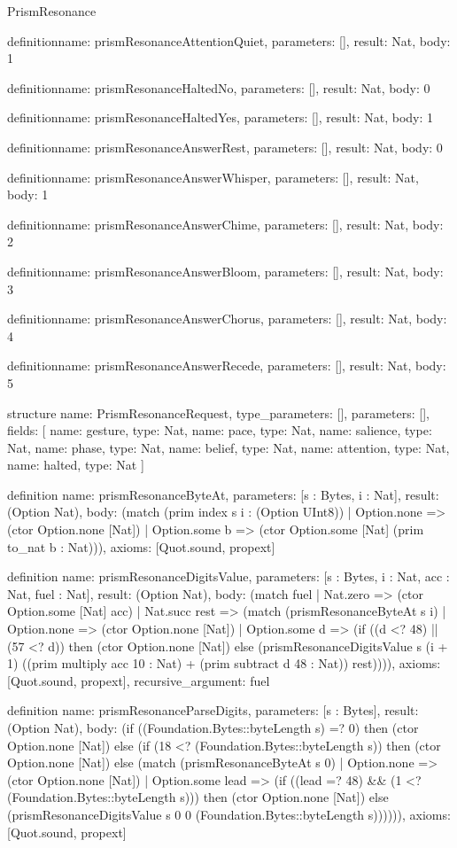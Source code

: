 \begin{lexlean}{PrismResonance}
\begin{semanticmodule}
definition{name: prismResonanceAttentionQuiet, parameters: [], result: Nat, body: 1}

definition{name: prismResonanceHaltedNo, parameters: [], result: Nat, body: 0}

definition{name: prismResonanceHaltedYes, parameters: [], result: Nat, body: 1}

definition{name: prismResonanceAnswerRest, parameters: [], result: Nat, body: 0}

definition{name: prismResonanceAnswerWhisper, parameters: [], result: Nat, body: 1}

definition{name: prismResonanceAnswerChime, parameters: [], result: Nat, body: 2}

definition{name: prismResonanceAnswerBloom, parameters: [], result: Nat, body: 3}

definition{name: prismResonanceAnswerChorus, parameters: [], result: Nat, body: 4}

definition{name: prismResonanceAnswerRecede, parameters: [], result: Nat, body: 5}

structure{
  name: PrismResonanceRequest,
  type_parameters: [],
  parameters: [],
  fields: [
    {name: gesture, type: Nat},
    {name: pace, type: Nat},
    {name: salience, type: Nat},
    {name: phase, type: Nat},
    {name: belief, type: Nat},
    {name: attention, type: Nat},
    {name: halted, type: Nat}
  ]
}

definition{
  name: prismResonanceByteAt,
  parameters: [s : Bytes, i : Nat],
  result: (Option Nat),
  body: (match (prim index s i : (Option UInt8))
    | Option.none => (ctor Option.none [Nat])
    | Option.some b => (ctor Option.some [Nat] (prim to_nat b : Nat))),
  axioms: [Quot.sound, propext]
}

definition{
  name: prismResonanceDigitsValue,
  parameters: [s : Bytes, i : Nat, acc : Nat, fuel : Nat],
  result: (Option Nat),
  body: (match fuel
    | Nat.zero => (ctor Option.some [Nat] acc)
    | Nat.succ rest => (match (prismResonanceByteAt s i)
      | Option.none => (ctor Option.none [Nat])
      | Option.some d => (if ((d <? 48) || (57 <? d)) then (ctor Option.none [Nat]) else (prismResonanceDigitsValue s (i + 1) ((prim multiply acc 10 : Nat) + (prim subtract d 48 : Nat)) rest)))),
  axioms: [Quot.sound, propext],
  recursive_argument: fuel
}

definition{
  name: prismResonanceParseDigits,
  parameters: [s : Bytes],
  result: (Option Nat),
  body: (if ((Foundation.Bytes::byteLength s) =? 0) then (ctor Option.none [Nat]) else (if (18 <? (Foundation.Bytes::byteLength s)) then (ctor Option.none [Nat]) else (match (prismResonanceByteAt s 0)
    | Option.none => (ctor Option.none [Nat])
    | Option.some lead => (if ((lead =? 48) && (1 <? (Foundation.Bytes::byteLength s))) then (ctor Option.none [Nat]) else (prismResonanceDigitsValue s 0 0 (Foundation.Bytes::byteLength s)))))),
  axioms: [Quot.sound, propext]
}


\end{semanticmodule}
\end{lexlean}
